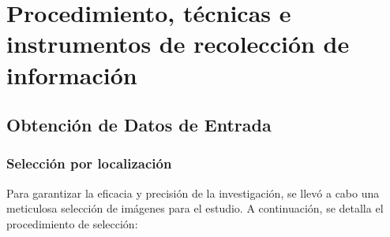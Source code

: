     \section{Procedimiento, técnicas e instrumentos de recolección de información}

       \subsection{Obtención de Datos de Entrada}
            \subsubsection{Selección por localización}
                Para garantizar la eficacia y precisión de la investigación, se llevó a cabo una meticulosa selección de imágenes para el estudio. A continuación, se detalla el procedimiento de selección:
                
